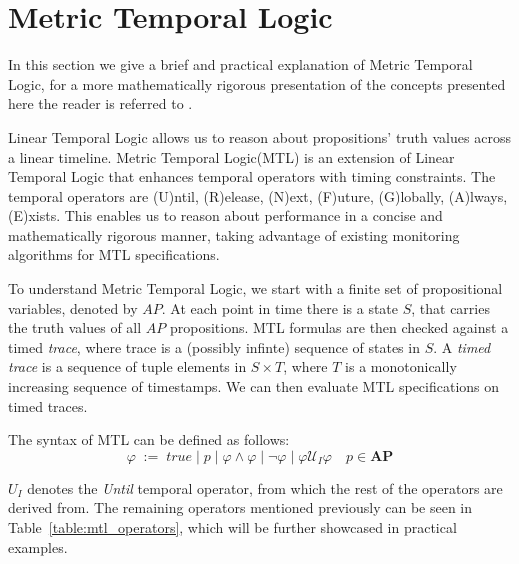 \documentclass[twocolumn]{article}
\begin{document}
\section{Metric Temporal Logic}
In this section we give a brief and practical explanation of Metric Temporal Logic, for a more mathematically rigorous presentation of the concepts presented here the reader is referred to \cite{hendriks_checking_2016,dhananjayan_metric_2014,thati_monitoring_2005,pnueli_temporal_1977}.
\par
Linear Temporal Logic \cite{pnueli_temporal_1977} allows us to reason about propositions' truth values across a linear timeline.
Metric Temporal Logic(MTL) \cite{koymans_specifying_1990} is an extension of Linear Temporal Logic that enhances temporal operators with timing constraints. The temporal operators are (U)ntil, (R)elease, (N)ext, (F)uture, (G)lobally, (A)lways, (E)xists.
This enables us to reason about performance in a concise and mathematically rigorous manner, taking advantage of existing
monitoring algorithms for MTL specifications.

\par
To understand Metric Temporal Logic, we start with a finite set of propositional variables, denoted by $AP$.
At each point in time there is a state $S$, that carries the truth values of all $AP$ propositions.
MTL formulas are then checked against a timed \emph{trace}, where trace is a (possibly infinte) sequence of states in $S$.
A \emph{timed trace} is a sequence of tuple elements in $S \times T$, where $T$ is a monotonically increasing sequence of timestamps.
We can then evaluate MTL specifications on timed traces.

\par
The syntax of MTL can be defined as follows:
\[
	\varphi \; := \; true \; | \; p \; | \; \varphi \land \varphi \; | \; \neg \varphi \; | \; \varphi \mathcal{U}_I \varphi \quad p \in \mathbf{AP}
\]

$U_I$ denotes the \emph{Until} temporal operator, from which the rest of the operators are derived from.
The remaining operators mentioned previously can be seen in Table~\ref{table:mtl_operators}, which will
be further showcased in practical examples.
\end{document}
